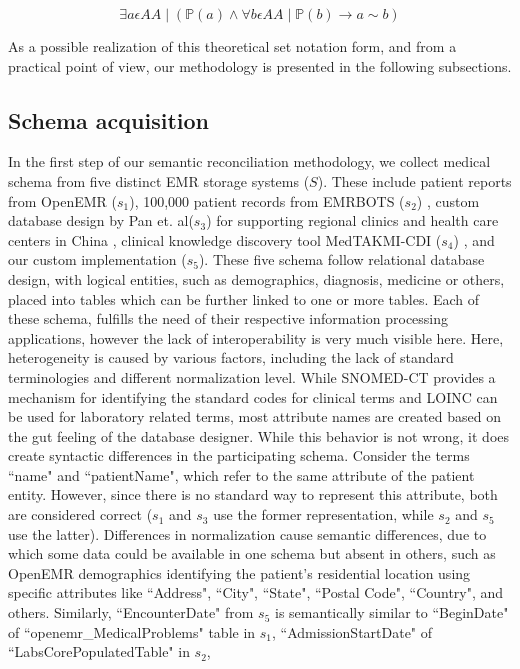 \begin{equation}\label{uniqueA}
\exists a \epsilon AA \mid ( \mathbb{P}(a) \wedge \forall b \epsilon AA \mid \mathbb{P}(b) \rightarrow a \sim b)
\end{equation}


As a possible realization of this theoretical set notation form, and from a practical point of view, our methodology is presented in the following subsections.

\subsection*{Schema acquisition}
\label{schema_acq}
In the first step of our semantic reconciliation methodology, we collect medical schema from five distinct EMR storage systems ($S$). These include patient reports from OpenEMR ($s_1$), 100,000 patient records from EMRBOTS ($s_2$) \cite{kartoun2016methodology}, custom database design by Pan et. al($s_3$) for supporting regional clinics and health care centers in China \cite{pan2016design}, clinical knowledge discovery tool MedTAKMI-CDI ($s_4$) \cite{inokuchi2007medtakmi}, and our custom implementation ($s_5$). These five schema follow relational database design, with logical entities, such as demographics, diagnosis, medicine or others, placed into tables which can be further linked to one or more tables. Each of these schema, fulfills the need of their respective information processing applications, however the lack of interoperability is very much visible here. Here, heterogeneity is caused by various factors, including the lack of standard terminologies and different normalization level.
While SNOMED-CT provides a mechanism for identifying the standard codes for clinical terms and LOINC can be used for laboratory related terms, most attribute names are created based on the gut feeling of the database designer. While this behavior is not wrong, it does create syntactic differences in the participating schema. Consider the terms ``name" and ``patientName", which refer to the same attribute of the patient entity.  However, since there is no standard way to represent this attribute, both are considered correct ($s_1$ and $s_3$ use the former representation, while $s_2$ and $s_5$ use the latter). 
Differences in normalization cause semantic differences, due to which some data could be available in one schema but absent in others, such as OpenEMR demographics identifying the patient's residential location using specific attributes like ``Address", ``City", ``State", ``Postal Code", ``Country", and others. Similarly, ``EncounterDate" from $s_5$ is semantically similar to ``BeginDate" of ``openemr\_MedicalProblems" table in $s_1$, ``AdmissionStartDate" of ``LabsCorePopulatedTable" in $s_2$, 

